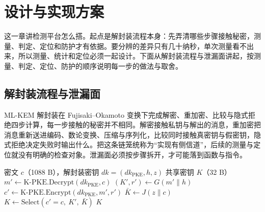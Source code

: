 \renewcommand{\algorithmicrequire}{\textbf{输入：}}
\renewcommand{\algorithmicensure}{\textbf{输出：}}
\renewcommand{\lstlistingname}{代码}
\lstset{
  language=C,
  basicstyle=\ttfamily\footnotesize,
  numbers=left,
  numberstyle=\tiny,
  columns=fullflexible,
  keepspaces=true,
  frame=single,
  xleftmargin=2.2em,
  framexleftmargin=1.6em,
  aboveskip=6pt,
  belowskip=6pt,
  showstringspaces=false
}

\section{设计与实现方案}

这一章讲检测平台怎么搭。起点是解封装流程本身：先弄清哪些步骤接触秘密，测量、判定、定位和防护才有依据。要分辨的差异只有几十纳秒，单次测量看不出来，所以测量、统计和定位必须一起设计。下面从解封装流程与泄漏面讲起，按测量、判定、定位、防护的顺序说明每一步的做法与取舍。

\subsection{解封装流程与泄漏面}

ML-KEM 解封装在 Fujisaki--Okamoto 变换下完成解密、重加密、比较与隐式拒绝四步计算，每一步接触的秘密并不相同。解密接触私钥与解出的消息，重加密把消息重新送进编码、数论变换、压缩与序列化，比较同时接触真密钥与假密钥，隐式拒绝决定失败时输出什么。把这条链笼统称为“实现有侧信道”，后续的测量与定位就没有明确的检查对象。泄漏面必须按步骤拆开，才可能落到函数与指令。\cite{fips203}

\begin{algorithm}[H]
\caption{ML-KEM 解封装与隐式拒绝}
\label{alg:decaps}
\begin{algorithmic}[1]
\Require 密文 $c$（1088 B），解封装密钥 $dk=(dk_{\mathrm{PKE}},h,z)$
\Ensure 共享密钥 $K$（32 B）
\State $m' \gets \mathrm{K\text{-}PKE.Decrypt}(dk_{\mathrm{PKE}}, c)$ 
\State $(K', r') \gets G(m' \parallel h)$ 
\State $c' \gets \mathrm{K\text{-}PKE.Encrypt}(dk_{\mathrm{PKE}}, m', r')$ 
\State $\bar K \gets J(z \parallel c)$ 
\State $K \gets \mathrm{Select}(c' = c,\ K',\ \bar K)$ 
\State \Return $K$
\end{algorithmic}
\end{algorithm}

